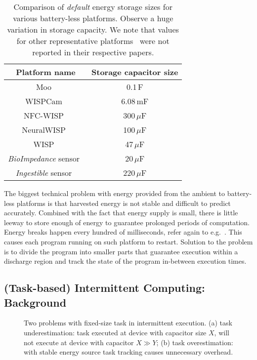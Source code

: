 \begin{table}
	\begin{tabular}{|c|c|}
	\hline
	Platform name & Storage capacitor size \\
	\hline \hline
	Moo~\cite{moo} & 0.1\,F \\
	WISPCam~\cite{naderiparizi_rfid_2015} & 6.08\,mF \\ %
	NFC-WISP~\cite{zhao_rfid_2015} & 300\,$\mu$F \\
	NeuralWISP~\cite{holleman_biocas_2008} & 100\,$\mu$F \\
	WISP~\cite{wisp5} & 47\,$\mu$F \\
	{\em BioImpedance} sensor~\cite{rodriguez_tbcs_2015} & 20\,$\mu$F \\
	{\em Ingestible} sensor~\cite{nadeau_naturebio_2017} & 220\,$\mu$F\\
	\hline
	\end{tabular} 
\caption{Comparison of {\em default} energy storage sizes for various battery-less platforms. Observe a huge variation in storage capacity. We note that values for other representative platforms~\cite{medusa_farsens_2017,talla_imwut_2017,liu_sigcomm_2013,parks_sigcomm_2014} were not reported in their respective papers.}
\label{table:capacitor}
\end{table}

The biggest technical problem with energy provided from the ambient to battery-less platforms is that harvested energy is not stable and difficult to predict accurately. Combined with the fact that energy supply is small, there is little leeway to store enough of energy to guarantee prolonged periods of computation. Energy breaks happen every hundred of milliseconds, refer again to e.g.~\cite[Fig. 1]{mementos}. This causes each program running on such platform to restart. Solution to the problem is to divide the program into smaller parts that guarantee execution within a discharge region and track the state of the program in-between execution times.

\subsection{(Task-based) Intermittent Computing: Background}

\begin{figure}
	\centering
	\caption{Two problems with fixed-size task in intermittent execution. (a) task underestimation: task executed at device with capacitor size $X$, will not execute at device with capacitor $X\gg Y$; (b) task overestimation: with stable energy source task tracking causes unnecessary overhead.}
	\label{fig:fixed_task_problem}
\end{figure}

